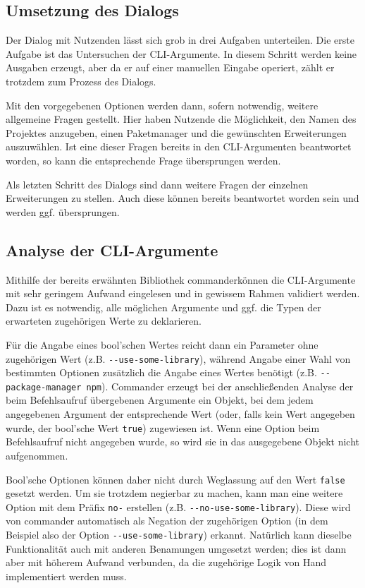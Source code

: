 \subsection{Umsetzung des Dialogs}
Der Dialog mit Nutzenden lässt sich grob in drei Aufgaben unterteilen. Die erste Aufgabe ist das Untersuchen der \gls{CLI}-Argumente. In diesem Schritt werden keine Ausgaben erzeugt, aber da er auf einer manuellen Eingabe operiert, zählt er trotzdem zum Prozess des Dialogs.

Mit den vorgegebenen Optionen werden dann, sofern notwendig, weitere allgemeine Fragen gestellt. Hier haben Nutzende die Möglichkeit, den Namen des Projektes anzugeben, einen Paketmanager und die gewünschten Erweiterungen auszuwählen. Ist eine dieser Fragen bereits in den \gls{CLI}-Argumenten beantwortet worden, so kann die entsprechende Frage übersprungen werden.

Als letzten Schritt des Dialogs sind dann weitere Fragen der einzelnen Erweiterungen zu stellen. Auch diese können bereits beantwortet worden sein und werden ggf. übersprungen.

\subsection{Analyse der CLI-Argumente}
Mithilfe der bereits erwähnten Bibliothek \glqq commander\grqq können die \gls{CLI}-Argumente mit sehr geringem Aufwand eingelesen und in gewissem Rahmen validiert werden. Dazu ist es notwendig, alle möglichen Argumente und ggf. die Typen der erwarteten zugehörigen Werte zu deklarieren.

Für die Angabe eines bool'schen Wertes reicht dann ein Parameter ohne zugehörigen Wert (z.B. \verb|--use-some-library|), während Angabe einer Wahl von bestimmten Optionen zusätzlich die Angabe eines Wertes benötigt (z.B. \verb|--package-manager npm|). Commander erzeugt bei der anschließenden Analyse der beim Befehlsaufruf übergebenen Argumente ein Objekt, bei dem jedem angegebenen Argument der entsprechende Wert (oder, falls kein Wert angegeben wurde, der bool'sche Wert \verb|true|) zugewiesen ist. Wenn eine Option beim Befehlsaufruf nicht angegeben wurde, so wird sie in das ausgegebene Objekt nicht aufgenommen.

Bool'sche Optionen können daher nicht durch Weglassung auf den Wert \verb|false| gesetzt werden. Um sie trotzdem negierbar zu machen, kann man eine weitere Option mit dem Präfix \verb|no-| erstellen (z.B. \verb|--no-use-some-library|). Diese wird von commander automatisch als Negation der zugehörigen Option (in dem Beispiel also der Option \verb|--use-some-library|) erkannt. Natürlich kann dieselbe Funktionalität auch mit anderen Benamungen umgesetzt werden; dies ist dann aber mit höherem Aufwand verbunden, da die zugehörige Logik von Hand implementiert werden muss.

